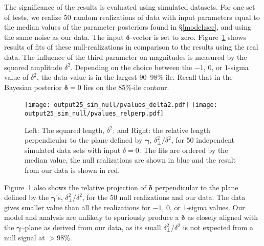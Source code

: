 \documentclass{aastex61}   	%
\begin{document}
\color{red}
The significance of the results is evaluated using simulated datasets.
For one set of tests, we realize 50 random realizations of data with input  parameters equal to the median values of the 
parameter posteriors found in
\S\ref{model:sec}, and using the same noise as our data.  The input $\pmb{\delta}$-vector is set to zero.
Figure~\ref{pvalues_delta2:fig} shows results of fits of these null-realizations in comparison to the results using the real data.
The influence of the third parameter on magnitudes is measured by the squared amplitude  $\delta^2$.
Depending on the choice between the  $-1$, 0, or $1$-sigma
value of  $\delta^2$, the data value is in the largest 90--98\%-ile.  Recall that in the Bayesian posterior
$\pmb{\delta}=0$ lies on the 85\%-ile contour.

\begin{figure}[htbp] %
   \centering
   \texttt{[image: output25\_sim\_null/pvalues\_delta2.pdf]} 
  \texttt{[image: output25\_sim\_null/pvalues\_relperp.pdf]} 
            \caption{ Left: The squared length, $\delta^2$;  and Right: the relative length perpendicular to the plane defined by $\pmb{\gamma}$, $\delta_\perp^2/\delta^2$, for 50 independent simulated data sets with input $\delta=0$.  The fits
            are ordered by the median value, the null realizations are shown in blue and the result from our data is shown in red.
            \label{pvalues_delta2:fig}}
\end{figure}

Figure~\ref{pvalues_delta2:fig} also shows the 
relative projection of $\pmb{\delta}$  perpendicular to the plane defined by the $\pmb{\gamma}$'s, $\delta_\perp^2/\delta^2$,
for the 50 null realizations
and our data.  The data gives smaller value than all the realizations for $-1$, 0, or $1$-sigma values.  
Our model and analysis are unlikely to spuriously produce a $\pmb{\delta}$ as closely aligned with the $\pmb{\gamma}$--plane
as derived from our data, as its small  $\delta_\perp^2/\delta^2$  is not expected from a null signal at $>98$\%.
\end{document}
